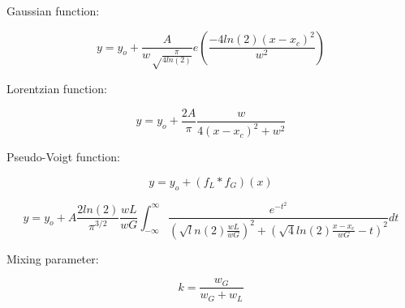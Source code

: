 \documentclass{article}
\begin{document}
Gaussian function:

\begin{equation}
  y = y_{o} + \frac{ A }{ w\sqrt\frac{\pi}{4ln(2)} } e(\frac{ -4ln(2)(x-x_{c})^{2} }{ w^{2} })
\end{equation}

\vspace{3cm}

Lorentzian function:

\begin{equation}
  y = y_{o} + \frac{ 2A }{ \pi } \frac{ w }{ 4(x-x_{c})^{2} + {w}^{2} }
\end{equation}

\vspace{3cm}

Pseudo-Voigt function:

\begin{equation}
  y = y_{o} + (f_{L}*f_{G})(x)
\end{equation}

\begin{equation}
  y = y_{o} + A \frac{ 2ln(2) }{ \pi^{3/2} } \frac{ wL }{ wG } \int_{ -\infty }^{ \infty } \frac{ e^{-t^{2}} }{ (\sqrt ln(2)\frac{ wL }{ wG })^2+(\sqrt 4ln(2)\frac{ x-x_{c} }{ wG }-t)^2 } dt
\end{equation}

\vspace{3cm}

Mixing parameter:

\begin{equation}
  k = \frac{w_{G}}{w_{G} + w_{L}}
\end{equation}
\end{document}
